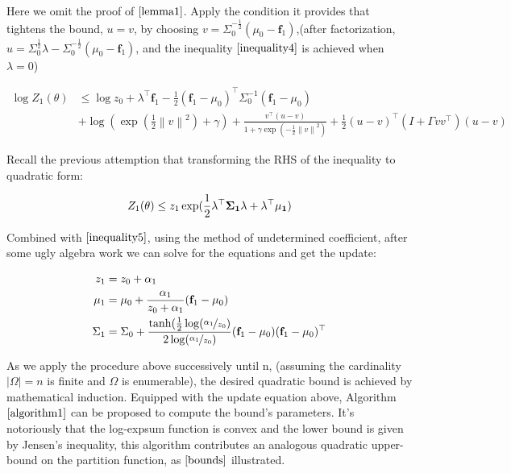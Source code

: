 \documentclass{article}
\begin{document}
 Here we omit the proof of $\ref{lemma1}$. Apply the condition it provides that tightens the bound, $u = v$, by choosing $v = \Sigma_0^{-\frac{1}{2}}(\mu_0 - \textbf{f}_1)$,(after factorization,
 $u = \Sigma_0^{\frac{1}{2}} \lambda - \Sigma_0^{-\frac{1}{2}}(\mu_0 - \textbf{f}_1)$, and the inequality $\ref{inequality4}$ is achieved when $\lambda = 0$) 
 
 \begin{equation}
  \begin{aligned}
   \log Z_1(\theta) & \leq \log z_0 + \lambda^{\top}\textbf{f}_1 - \frac{1}{2} (\textbf{f}_1 - \mu_0)^{\top} \Sigma_0^{-1} (\textbf{f}_1 - \mu_0) \\
          & + \log(\exp(\frac{1}{2}\left\lVert v \right\lVert^2) + \gamma) + \frac{ v^{\top} (u- v)}{1 + \gamma \exp(-\frac{1}{2}\left\lVert v \right\lVert^2)} + \frac{1}{2}(u-v)^{\top} (I + \Gamma vv^{\top})(u-v)         \nonumber
       \label{inequality5}
  \end{aligned}
 \end{equation}
 
 Recall the previous attemption that transforming the RHS of the inequality to quadratic form:

 \begin{equation}
  \begin{aligned}
   Z_{1}(\theta )  \leq z_1 \exp(\frac{1}{2} \bf{\lambda}^{\top} \Sigma_1 \lambda + \lambda^{\top} \bf{\mu}_1) 
  \end{aligned}
 \end{equation} 

 Combined with $\ref{inequality5}$, using the method of undetermined coefficient, after some ugly algebra work we can solve for the equations and get the update:

 \begin{equation}
  \begin{aligned}
    z_1 &= z_0 + \alpha_1 \\ \nonumber 
    \mu_1 &=  \mu_0 + \frac{\alpha_1}{z_0 + \alpha_1} (\textbf{f}_1 - \mu_0) \\
    \Sigma_1 &= \Sigma_0 + \frac{\tanh(\frac{1}{2}\log(\nicefrac{\alpha_1}{z_0})}{2\log(\nicefrac{\alpha_1}{z_0})} (\textbf{f}_1 - \mu_0)(\textbf{f}_1 - \mu_0)^{\top}
     \end{aligned}
 \end{equation} 

 As we apply the procedure above successively until n, (assuming the cardinality $|\Omega| = n$ is finite and $\Omega$ is enumerable), the desired
 quadratic bound is achieved by mathematical induction.
 Equipped with the update equation above, Algorithm $\ref{algorithm1}$ can be proposed to compute the bound's parameters. It's notoriously that the log-expsum function
 is convex and the lower bound is given by Jensen's inequality, this algorithm contributes an analogous quadratic upper-bound on the partition function, as $\ref{bounds}$
 illustrated.
\end{document}
